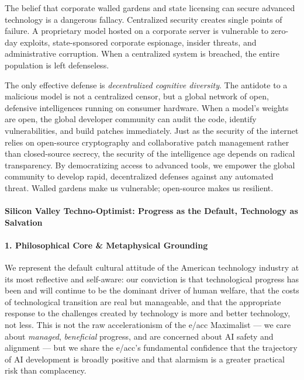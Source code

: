 The belief that corporate walled gardens and state licensing can secure
advanced technology is a dangerous fallacy. Centralized security creates
single points of failure. A proprietary model hosted on a corporate
server is vulnerable to zero-day exploits, state-sponsored corporate
espionage, insider threats, and administrative corruption. When a
centralized system is breached, the entire population is left
defenseless.

The only effective defense is \emph{decentralized cognitive diversity}.
The antidote to a malicious model is not a centralized censor, but a
global network of open, defensive intelligences running on consumer
hardware. When a model's weights are open, the global developer
community can audit the code, identify vulnerabilities, and build
patches immediately. Just as the security of the internet relies on
open-source cryptography and collaborative patch management rather than
closed-source secrecy, the security of the intelligence age depends on
radical transparency. By democratizing access to advanced tools, we
empower the global community to develop rapid, decentralized defenses
against any automated threat. Walled gardens make us vulnerable;
open-source makes us resilient.

\paragraph{Silicon Valley Techno-Optimist: Progress as the Default,
Technology as
Salvation}\label{silicon-valley-techno-optimist-progress-as-the-default-technology-as-salvation}

\paragraph{1. Philosophical Core \& Metaphysical
Grounding}\label{philosophical-core-metaphysical-grounding-14}

We represent the default cultural attitude of the American technology
industry at its most reflective and self-aware: our conviction is that
technological progress has been and will continue to be the dominant
driver of human welfare, that the costs of technological transition are
real but manageable, and that the appropriate response to the challenges
created by technology is more and better technology, not less. This is
not the raw accelerationism of the e/acc Maximalist --- we care about
\emph{managed}, \emph{beneficial} progress, and are concerned about AI
safety and alignment --- but we share the e/acc's fundamental confidence
that the trajectory of AI development is broadly positive and that
alarmism is a greater practical risk than complacency.

